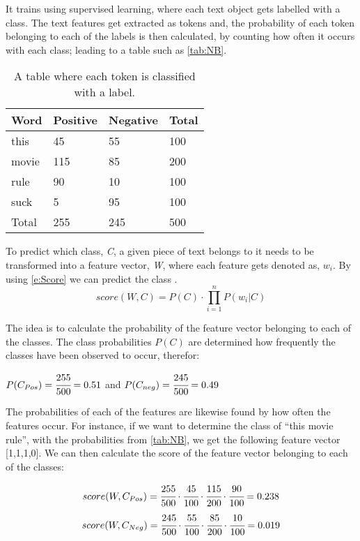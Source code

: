 It trains using supervised learning, where each text object gets labelled with a
class. The text features get extracted as tokens and, the probability of each
token belonging to each of the labels is then calculated, by counting how often
it occurs with each class; leading to a table such as \autoref{tab:NB}.

\begin{table}[H]
\centering
\begin{tabular}{|l|l|l|l|}
\hline
Word & Positive & Negative & Total 	\\ \hline
this & 45 & 55 & 100				\\ \hline
movie & 115 & 85 & 200				\\ \hline
rule & 90 & 10 & 100				\\ \hline
suck & 5 & 95 & 100					\\ \hline
Total & 255 & 245 & 500				\\ \hline
\end{tabular}
\caption{A table where each token is classified with a label.}
\label{tab:NB}
\end{table}

To predict which class, \textit{C}, a given piece of text belongs to it needs to
be transformed into a feature vector, \textit{W}, where each feature gets
denoted as, $w_{i}$. By using \autoref{e:Score} we can predict the class
\citep[Ch.2.1]{Bayes}.
\begin{equation}\label{e:Score} score(W,C) = P(C) \cdot
\displaystyle\prod_{i=1}^{n}P(w_{i}|C)
\end{equation}

The idea is to calculate the probability of the feature vector belonging to each
of the classes. The class probabilities $P(C)$ are determined how frequently the
classes have been observed to occur, therefor:
\begin{center}
$P(C_{Pos}) = \cfrac{255}{500} = 0.51 $ and $P(C_{neg}) = \cfrac{245}{500} =
0.49 $
\end{center}
The probabilities of each of the features are likewise found by how often the
features occur. For instance, if we want to determine the class of ``this
movie rule'', with the probabilities from \autoref{tab:NB}, we get the
following feature vector [1,1,1,0]. We can then calculate the score of
the feature vector belonging to each of the classes:

\begin{equation}\label{e:Pos}
score(W, C_{Pos}) = \cfrac{255}{500} \cdot \cfrac{45}{100} \cdot
\cfrac{115}{200} \cdot \cfrac{90}{100} = 0.238
\end{equation}
\begin{equation}\label{e:Neg}
score(W, C_{Neg}) = \cfrac{245}{500} \cdot \cfrac{55}{100} \cdot \cfrac{85}{200}
\cdot \cfrac{10}{100} = 0.019
\end{equation}

